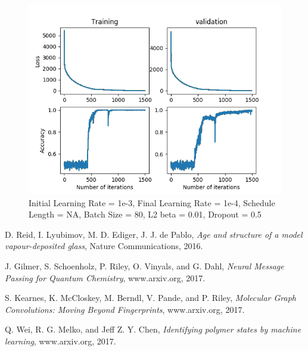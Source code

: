 \documentclass[12pt,reqno]{amsart}
\numberwithin{equation}{section}
\begin{document}
\begin{enumerate}
\begin{figure}[H]
\centering
\includegraphics[scale=0.6]{Commit-test-7}
\caption{Initial Learning Rate = 1e-3, Final Learning Rate = 1e-4, Schedule Length = NA, Batch Size = 80, L2 beta = 0.01, Dropout = 0.5}
\end{figure}


\end{enumerate}




\begin{thebibliography}{Al-F11}
D. Reid, I. Lyubimov, M. D. Ediger, J. J. de Pablo, \textit{Age and structure of a model vapour-deposited glass}, Nature Communications, 2016. 

 J. Gilmer, S. Schoenholz, P. Riley, O. Vinyals, and G. Dahl, \textit{Neural Message Passing for Quantum Chemistry}, www.arxiv.org, 2017.  

S. Kearnes, K. McCloskey, M. Berndl, V. Pande, and P. Riley, \textit{Molecular Graph Convolutions: Moving Beyond Fingerprints}, www.arxiv.org, 2017.

Q. Wei, R. G. Melko, and Jeff Z. Y. Chen, \textit{Identifying polymer states by machine learning}, www.arxiv.org, 2017.  

\end{thebibliography}
\end{document}
